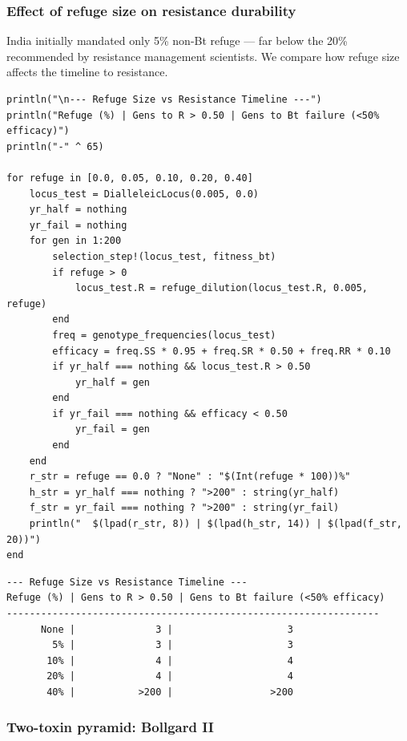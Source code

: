\subsubsection{Effect of refuge size on resistance durability}



\label{5299512861519549943}{}


India initially mandated only 5\% non-Bt refuge — far below the 20\% recommended by resistance management scientists. We compare how refuge size affects the timeline to resistance.




\begin{verbatim}
println("\n--- Refuge Size vs Resistance Timeline ---")
println("Refuge (%) | Gens to R > 0.50 | Gens to Bt failure (<50% efficacy)")
println("-" ^ 65)

for refuge in [0.0, 0.05, 0.10, 0.20, 0.40]
    locus_test = DialleleicLocus(0.005, 0.0)
    yr_half = nothing
    yr_fail = nothing
    for gen in 1:200
        selection_step!(locus_test, fitness_bt)
        if refuge > 0
            locus_test.R = refuge_dilution(locus_test.R, 0.005, refuge)
        end
        freq = genotype_frequencies(locus_test)
        efficacy = freq.SS * 0.95 + freq.SR * 0.50 + freq.RR * 0.10
        if yr_half === nothing && locus_test.R > 0.50
            yr_half = gen
        end
        if yr_fail === nothing && efficacy < 0.50
            yr_fail = gen
        end
    end
    r_str = refuge == 0.0 ? "None" : "$(Int(refuge * 100))%"
    h_str = yr_half === nothing ? ">200" : string(yr_half)
    f_str = yr_fail === nothing ? ">200" : string(yr_fail)
    println("  $(lpad(r_str, 8)) | $(lpad(h_str, 14)) | $(lpad(f_str, 20))")
end
\end{verbatim}




\begin{verbatim}
--- Refuge Size vs Resistance Timeline ---
Refuge (%) | Gens to R > 0.50 | Gens to Bt failure (<50% efficacy)
-----------------------------------------------------------------
      None |              3 |                    3
        5% |              3 |                    3
       10% |              4 |                    4
       20% |              4 |                    4
       40% |           >200 |                 >200
\end{verbatim}



\subsubsection{Two-toxin pyramid: Bollgard II}



